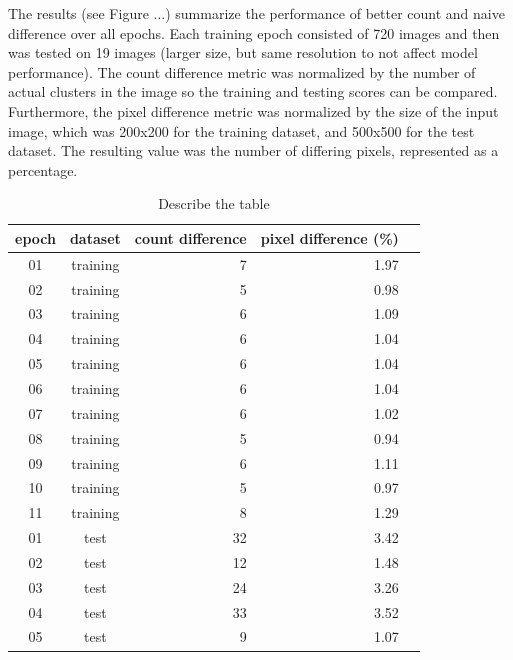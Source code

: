 \documentclass{article}
\begin{document}
The results (see Figure ...) summarize the performance of better count and 
naive difference over all epochs. Each training epoch consisted of 720 images 
and then was tested on 19 images (larger size, but same resolution to not 
affect model performance). The count difference metric was normalized by the 
number of actual clusters in the image so the training and testing scores can 
be compared. Furthermore, the pixel difference metric was normalized by the 
size of the input image, which was 200x200 for the training dataset, and 
500x500 for the test dataset. The resulting value was the number of differing 
pixels, represented as a percentage.

\begin{table}
  \caption{Describe the table}
  \label{tbl:epoch-summary}
  \centering
  \begin{tabular}{ccrrr}
    \toprule
    epoch &  dataset & count difference & pixel difference (\%) \\
    \midrule
    01    & training &                7 &             1.97 \\
    02    & training &                5 &             0.98 \\
    03    & training &                6 &             1.09 \\
    04    & training &                6 &             1.04 \\
    05    & training &                6 &             1.04 \\
    06    & training &                6 &             1.04 \\
    07    & training &                6 &             1.02 \\
    08    & training &                5 &             0.94 \\
    09    & training &                6 &             1.11 \\
    10    & training &                5 &             0.97 \\
    11    & training &                8 &             1.29 \\
    \midrule
    01    &   test   &               32 &             3.42 \\
    02    &   test   &               12 &             1.48 \\
    03    &   test   &               24 &             3.26 \\
    04    &   test   &               33 &             3.52 \\
    05    &   test   &                9 &             1.07 \\

\end{tabular}
\end{table}
\end{document}
